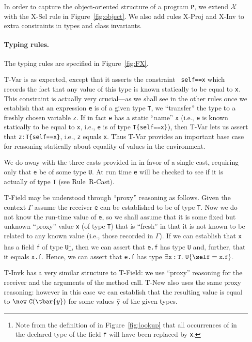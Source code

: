 In order to capture the object-oriented structure of a program {\tt P}, we extend $\cal X$ with the {\sc X-Sel} rule in Figure~\ref{fig:object}. We also add rules {\sc X-Proj} and {\sc X-Inv} to extra constraints in types and class invariants.

\paragraph{Typing rules.} The typing rules are specified in Figure~\ref{fig:FX}.

{\sc T-Var} is as expected, except that it asserts the constraint {\tt
self==x} which records the fact that any value of this type is known
statically to be equal to {\tt x}. This constraint is actually very
crucial---as we shall see in the other rules once we establish that
an expression {\tt e} is of a given type {\tt T}, we ``transfer'' the
type to a freshly chosen variable {\tt z}. If in fact {\tt e} has a
static ``name'' {\tt x} (i.e., {\tt e} is known statically to be
equal to {\tt x}, i.e., {\tt e} is of type {\tt T\{self==x\}}), then
{\sc T-Var} lets us assert that {\tt z:T\{self==x\}}, i.e., {\tt z}
equals {\tt x}. Thus {\sc T-Var} provides an important base case for
reasoning statically about equality of values in the environment.

We do away with the three casts provided in \FJ{} in favor of a single
cast, requiring only that {\tt e} be of some type {\tt U}. At run time
{\tt e} will be checked to see if it is actually of type {\tt T} (see
Rule~{\sc R-Cast}).

{\sc T-Field} may be understood through ``proxy'' reasoning as
follows.  Given the context $\Gamma$ assume the receiver {\tt e} can
be established to be of type {\tt T}. Now we do not know the run-time
value of {\tt e}, so we shall assume that it is some fixed but unknown
``proxy'' value {\tt x} (of type {\tt T}) that is ``fresh'' in that it
is not known to be related to any known value (i.e., those recorded
in $\Gamma$).  If we can establish that {\tt x} has a field {\tt f} of
type {\tt U}\footnote{Note from the definition of
\fields{} in Figure~\ref{fig:lookup} that all occurrences of
\this{} in the declared type of the field {\tt f} will have been replaced
by {\tt x}.}, then we can assert that
{\tt e.f} has type {\tt U} and, further, that it equals {\tt x.f}.
Hence, we can assert that {\tt e.f} has type 
$\exists {\tt x}:{\tt T}.~{\tt U}\{\self={\tt x}.{\tt f}\}$.

{\sc T-Invk} has a very similar structure to {\sc T-Field}: we use
``proxy'' reasoning for the receiver and the arguments of the method
call. {\sc T-New} also uses the same proxy reasoning: however in this case
we can establish that the resulting value is equal to $\new~{\tt C}(\tbar{y})$
for some values $\bar{\tt y}$ of the given types.

